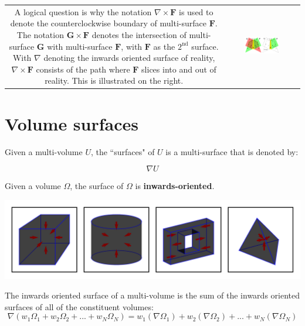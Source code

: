 \documentclass{book}
\begin{document}
\begin{tabular}{cc}
\parbox{0.5\textwidth}{
A logical question is why the notation \(\nabla \times \mathbf{F}\) is used to denote the counterclockwise boundary of multi-surface \(\mathbf{F}\). The notation \(\mathbf{G} \times \mathbf{F}\) denotes the intersection of multi-surface \(\mathbf{G}\) with multi-surface \(\mathbf{F}\), with \(\mathbf{F}\) as the \(2^\text{nd}\) surface. With \(\nabla\) denoting the inwards oriented surface of reality, \(\nabla \times \mathbf{F}\) consists of the path where \(\mathbf{F}\) slices into and out of reality. This is illustrated on the right.
} & \parbox{0.5\textwidth}{
\includegraphics[width = 0.5\textwidth]{Boundaries/Surface_boundaries/right_hand_rule_for_boundaries}
}
\end{tabular}




\section{Volume surfaces}

Given a multi-volume \(U\), the ``surfaces" of \(U\) is a multi-surface that is denoted by: 

\[\nabla U\]

Given a volume \(\Omega\), the surface of \(\Omega\) is {\bf inwards-oriented}. 

\begin{center}
\includegraphics[width = \textwidth]{Boundaries/Volume_inwards_oriented_surfaces/volume_surface_examples}
\end{center}

The inwards oriented surface of a multi-volume is the sum of the inwards oriented surfaces of all of the constituent volumes:
\[\nabla (w_1 \Omega_1 + w_2 \Omega_2 + ... + w_N \Omega_N)
= w_1(\nabla \Omega_1) + w_2(\nabla \Omega_2) + ... + w_N(\nabla \Omega_N)\]
\end{document}
